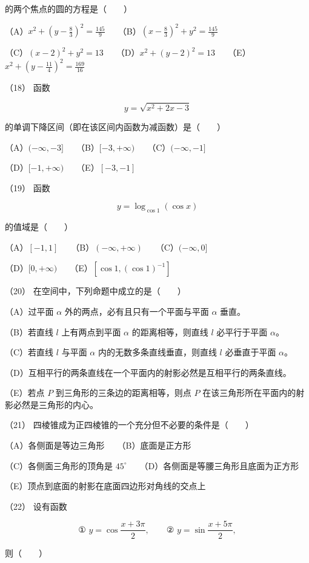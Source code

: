 \begin{answer}
的两个焦点的圆的方程是\mbox{（　　）}

（A）$x^2+(y-\frac83)^2=\frac{145}{9}$　　（B）$(x-\frac83)^2+y^2=\frac{145}{9}$

（C）$(x-2)^2+y^2=13$　　（D）$x^2+(y-2)^2=13$　　（E）$x^2+(y-\frac{11}4)^2=\frac{169}{16}$

（18） 函数

\nopagebreak[4]
\[
y=\sqrt{x^2+2x-3}
\]

的单调下降区间（即在该区间内函数为减函数）是\mbox{（　　）}

（A）$(-\infty,-3]$　　（B）$[-3,+\infty)$　　（C）$(-\infty,-1]$

（D）$[-1,+\infty)$　　（E）$[-3,-1]$

（19） 函数

\nopagebreak[4]
\[
y=\log_{\cos1}(\cos x)
\]

的值域是\mbox{（　　）}

（A）$[-1,1]$　　（B）$(-\infty,+\infty)$　　（C）$(-\infty,0]$

（D）$[0,+\infty)$　　（E）$[\cos1,(\cos1)^{-1}]$

（20） 在空间中，下列命题中成立的是\mbox{（　　）}

（A）过平面 $\alpha$ 外的两点，必有且只有一个平面与平面 $\alpha$ 垂直。

（B）若直线 $l$ 上有两点到平面 $\alpha$ 的距离相等，则直线 $l$ 必平行于平面 $\alpha$。

（C）若直线 $l$ 与平面 $\alpha$ 内的无数多条直线垂直，则直线 $l$ 必垂直于平面 $\alpha$。

（D）互相平行的两条直线在一个平面内的射影必然是互相平行的两条直线。

（E）若点 $P$ 到三角形的三条边的距离相等，则点 $P$ 在该三角形所在平面内的射影必然是三角形的内心。

（21） 四棱锥成为正四棱锥的一个充分但不必要的条件是\mbox{（　　）}

（A）各侧面是等边三角形　　（B）底面是正方形

（C）各侧面三角形的顶角是 $45^\circ$　　（D）各侧面是等腰三角形且底面为正方形

（E）顶点到底面的射影在底面四边形对角线的交点上

（22） 设有函数

\nopagebreak[4]
\[
\text{① }y=\cos\frac{x+3\pi}{2},\qquad
\text{② }y=\sin\frac{x+5\pi}{2},
\]

则\mbox{（　　）}


\end{answer}

